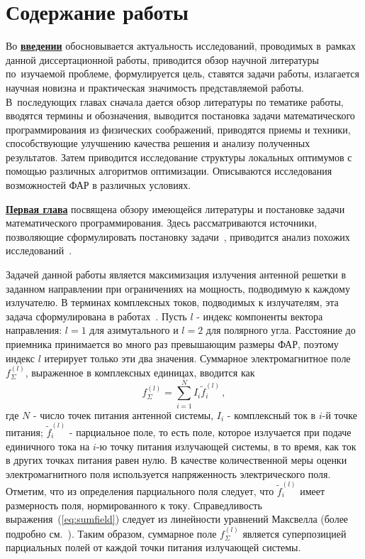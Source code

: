 \section*{Содержание работы}
Во \underline{\textbf{введении}} обосновывается актуальность
исследований, проводимых в~рамках данной диссертационной работы,
приводится обзор научной литературы по~изучаемой проблеме,
формулируется цель, ставятся задачи работы, излагается научная новизна
и практическая значимость представляемой работы. В~последующих главах
сначала дается обзор литературы по тематике работы, вводятся термины и обозначения, выводится постановка 
задачи математического программирования из физических соображений, приводятся 
приемы и техники, способствующие улучшению качества решения и анализу полученных
результатов. Затем приводится исследование структуры локальных оптимумов с помощью различных алгоритмов оптимизации. Описываются исследования возможностей ФАР в различных условиях.


\underline{\textbf{Первая глава}} посвящена обзору имеющейся литературы и постановке задачи математического программирования. Здесь рассматриваются источники, позволяющие сформулировать постановку задачи~\cite{sazonov:PAA, yurkov:farkv}, приводится анализ похожих исследований~\cite{luo:sdp}. 

Задачей данной работы является максимизация излучения антенной решетки в заданном направлении при ограничениях на мощность, подводимую к каждому излучателю. В терминах комплексных токов, подводимых к излучателям, эта задача сформулирована в работах~\cite{yurkov:farkv,yurkov:knd}. Пусть $l$ - индекс компоненты вектора направления: $l=1$ для азимутального и $l=2$ для полярного угла. Расстояние до приемника принимается во много раз превышающим размеры ФАР, поэтому индекс $l$ итерирует только эти два значения.
Суммарное электромагнитное поле $f^{(l)}_{\Sigma}$, выраженное в комплексных единицах, вводится как
%
\begin{equation}
    f^{(l)}_{\Sigma} = \sum_{i=1}^{N}I_i \tilde{f}_i^{(l)} \, ,
    \label{eq:sumfield}
\end{equation}
%
где $N$ - число точек питания антенной системы, $I_i$ - комплексный ток в $i$-й точке питания; $\tilde{f}_i^{(l)}$ - парциальное поле, то есть поле, которое излучается при подаче единичного тока на $i$-ю точку питания излучающей системы, в то время, как ток в других точках питания равен нулю. В качестве количественной меры оценки электромагнитного поля используется напряженность электрического поля. Отметим, что из определения парциального поля следует, что $\tilde{f}_i^{(l)}$ имеет размерность поля, нормированного к току. Справедливость выражения~(\ref{eq:sumfield}) следует из линейности уравнений Максвелла (более подробно см.~\cite{yurkov:farkv}). Таким образом, суммарное поле $f^{(l)}_{\Sigma}$ является суперпозицией парциальных полей от каждой точки питания излучающей системы.

